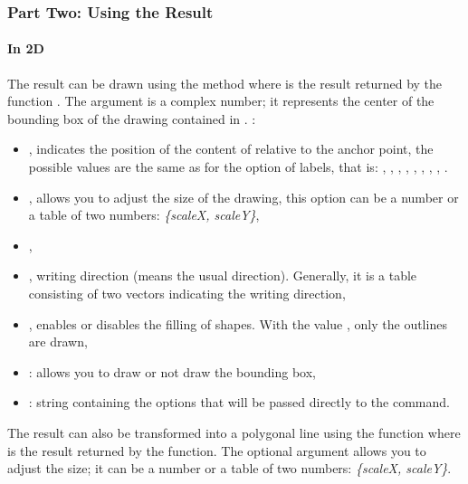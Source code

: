 \subsubsection{Part Two: Using the Result}

\paragraph{In 2D} The result can be drawn using the method  where  is the result returned by the function . The  argument is a complex number; it represents the center of the bounding box of the drawing contained in . \writeoptions:
\begin{itemize}
    \item {}, indicates the position of the content of  relative to the anchor point, the possible values ​​are the same as for the  option of labels, that is: , , , , , , , , .

    \item {}, allows you to adjust the size of the drawing, this option can be a number or a table of two numbers: \emph{\{scaleX, scaleY\}},

    \item {},

    \item {}, writing direction (\nil means the usual direction). Generally, it is a table consisting of two vectors  indicating the writing direction,

    \item {}, enables or disables the filling of shapes. With the value \true, only the outlines are drawn, 

    \item {}: allows you to draw or not draw the bounding box,

    \item {}: string containing the options that will be passed directly to the \drawcmd command.
\end{itemize}

The result can also be transformed into a polygonal line using the function  where  is the result returned by the  function. The optional argument  allows you to adjust the size; it can be a number or a table of two numbers: \emph{\{scaleX, scaleY\}}.

